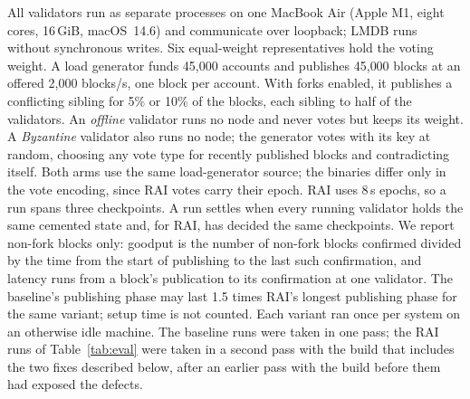 All validators run as separate processes on one MacBook Air (Apple M1, eight cores, 16\,GiB, macOS~14.6) and communicate over loopback; LMDB runs without synchronous writes. Six equal-weight representatives hold the voting weight. A load generator funds 45{,}000 accounts and publishes 45{,}000 blocks at an offered 2{,}000 blocks/s, one block per account. With forks enabled, it publishes a conflicting sibling for 5\% or 10\% of the blocks, each sibling to half of the validators. An \emph{offline} validator runs no node and never votes but keeps its weight. A \emph{Byzantine} validator also runs no node; the generator votes with its key at random, choosing any vote type for recently published blocks and contradicting itself. Both arms use the same load-generator source; the binaries differ only in the vote encoding, since RAI votes carry their epoch. RAI uses 8\,s epochs, so a run spans three checkpoints. A run settles when every running validator holds the same cemented state and, for RAI, has decided the same checkpoints. We report non-fork blocks only: goodput is the number of non-fork blocks confirmed divided by the time from the start of publishing to the last such confirmation, and latency runs from a block's publication to its confirmation at one validator. The baseline's publishing phase may last 1.5 times RAI's longest publishing phase for the same variant; setup time is not counted. Each variant ran once per system on an otherwise idle machine. The baseline runs were taken in one pass; the RAI runs of Table~\ref{tab:eval} were taken in a second pass with the build that includes the two fixes described below, after an earlier pass with the build before them had exposed the defects.

